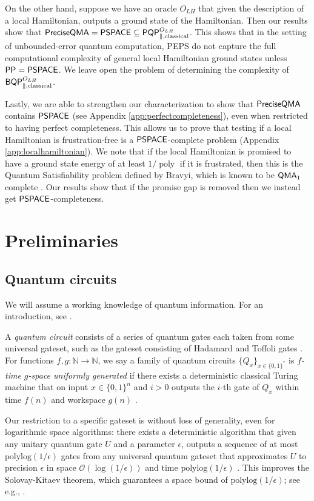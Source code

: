 \documentclass[11pt]{article}
\newtheorem{theorem}{Theorem}
\theoremstyle{definition}
\theoremstyle{remark}
\newcommand\QMA{{\sf{QMA}}}
\newcommand\PSPACE{{\sf{PSPACE}}}
\newcommand\PP{\sf{PP}}
\newcommand\BQP{{\sf{BQP}}}
\newcommand\PQP{{\sf{PQP}}}
\newcommand\preciseQMA{{\sf{PreciseQMA}}}
\newcommand\bigoh{\mathcal{O}}
\newcommand{\polylog}{\textrm{polylog}}
\DeclareMathOperator{\poly}{poly}
\begin{document}
On the other hand, suppose we have an oracle $O_{LH}$ that given the description of a local Hamiltonian, outputs a ground state of the Hamiltonian. Then our results show that $\preciseQMA = \PSPACE \subseteq \PQP^{O_{LH}}_{\parallel,\text{classical}}$. This shows that in the setting of unbounded-error quantum computation, PEPS do not capture the full computational complexity of general local Hamiltonian ground states unless $\PP=\PSPACE$. We leave open the problem of determining the complexity of $\BQP^{O_{LH}}_{\parallel,\text{classical}}$.

Lastly, we are able to strengthen our characterization to show that $\preciseQMA$ contains $\PSPACE$ (see Appendix \ref{app:perfectcompleteness}), even when restricted to having perfect completeness.  This allows us to prove that testing if a local Hamiltonian is frustration-free is a $\PSPACE$-complete problem (Appendix \ref{app:localhamiltonian}). We note that if the local Hamiltonian is promised to have a ground state energy of at least $1/\poly$ if it is frustrated, then this is the Quantum Satisfiability problem defined by Bravyi, which is known to be $\QMA_1$ complete \cite{bravyi06,gn13}. Our results show that if the promise gap is removed then we instead get $\PSPACE$-completeness.

 \section{Preliminaries}
\subsection{Quantum circuits}
We will assume a working knowledge of quantum information. For an introduction, see \cite{nc00}.

A \emph{quantum circuit} consists of a series of quantum gates each taken from some universal gateset, such as the gateset consisting of Hadamard and Toffoli gates \cite{shi}. %
 For functions $f,g:\mathbb{N}\rightarrow\mathbb{N}$, we say a family of quantum circuits $\{Q_x\}_{x\in\{0,1\}^*}$ is \emph{$f$-time $g$-space uniformly generated} if there exists a deterministic classical Turing machine that on input $x\in\{0,1\}^n$ and $i>0$ outputs the $i$-th gate of $Q_x$ within time $f(n)$ and workspace $g(n)$ \cite{nc00}.  
 
Our restriction to a specific gateset is without loss of generality, even for logarithmic space algorithms:  there exists a deterministic algorithm that given any unitary quantum gate $U$ and a parameter $\epsilon$, outputs a sequence of at most $\polylog({1/\epsilon})$ gates from any universal quantum gateset that approximates $U$ to precision $\epsilon$ in space $\bigoh({\log({1/\epsilon})})$ and time $\polylog({1/\epsilon})$ \cite{mw12}.  This improves the Solovay-Kitaev theorem, which guarantees a space bound of $\polylog(1/\epsilon)$; see e.g., \cite{nc00}.
\end{document}

